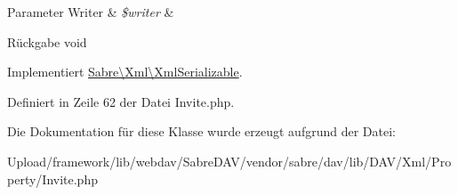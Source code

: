 \begin{DoxyParams}[1]{Parameter}
Writer & {\em \$writer} & \\
\hline
\end{DoxyParams}
\begin{DoxyReturn}{Rückgabe}
void 
\end{DoxyReturn}


Implementiert \mbox{\hyperlink{interface_sabre_1_1_xml_1_1_xml_serializable_aa78f3ee43aa699be8347181653a53d8c}{Sabre\textbackslash{}\+Xml\textbackslash{}\+Xml\+Serializable}}.



Definiert in Zeile 62 der Datei Invite.\+php.



Die Dokumentation für diese Klasse wurde erzeugt aufgrund der Datei\+:\begin{DoxyCompactItemize}
\item 
Upload/framework/lib/webdav/\+Sabre\+D\+A\+V/vendor/sabre/dav/lib/\+D\+A\+V/\+Xml/\+Property/Invite.\+php\end{DoxyCompactItemize}

